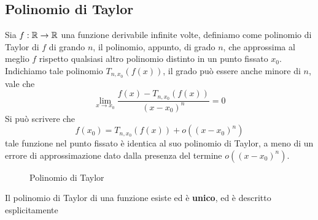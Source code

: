 \documentclass[10pt, letterpaper]{report}
\begin{document}
\subsection{Polinomio di Taylor}
Sia $f:{\mathbb R}\rightarrow {\mathbb R}$ una funzione derivabile infinite volte, definiamo come
polinomio di Taylor di $f$ di grando $n$, il polinomio, appunto, di grado $n$, che approssima
al meglio $f$ rispetto qualsiasi altro polinomio distinto in un punto fissato $x_0$.\acc
Indichiamo tale polinomio $T_{n,x_0}(f(x))$, il grado può essere anche minore di $n$,
vale che $$
    \lim_{x\rightarrow x_0}\dfrac{f(x)-T_{n,x_0}(f(x))}{(x-x_0)^n}=0
$$
Si può scrivere che $$f(x_0)=T_{n,x_0}(f(x))+o((x-x_0)^n)$$ tale funzione nel punto
fissato è identica al suo polinomio di Taylor, a meno di un errore di approssimazione dato
dalla presenza del termine $o((x-x_0)^n)$.
\begin{figure}[h!]
    \centering
    \label{fig:cos}
    \caption{Polinomio di Taylor}
\end{figure}\acc
Il polinomio di Taylor di una funzione esiste ed è \textbf{unico}, ed è descritto esplicitamente
\end{document}
